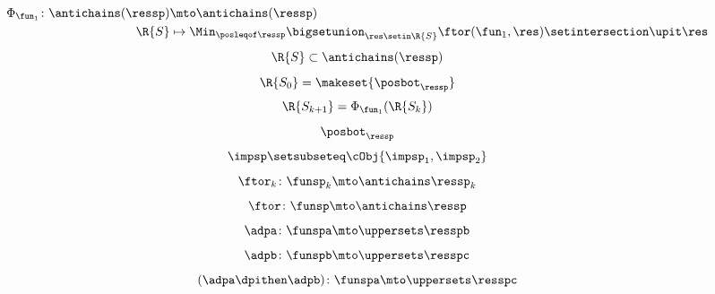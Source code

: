 {\begin{forslides}
\begin{equation}
\begin{aligned}
                \Phi_{\fun_1}\colon \antichains(\ressp) & \mto \antichains(\ressp) \\
                \R{S}                                   & \mapsto \Min_{\posleqof\ressp} \bigsetunion_{\res \setin \R{S}}\ftor(\fun_1,\res)\setintersection \upit \res
            \end{aligned}
        \end{equation}
        \begin{equation}
            \label{eq:genfun_11}
            \R{S}\subset \antichains(\ressp)
        \end{equation}
        \begin{equation}
            \label{eq:genfun_12}
            \R{S_0}=\makeset{ \posbot_\ressp}
        \end{equation}
        \begin{equation}
            \label{eq:genfun_13}
            \R{S_{k+1}}=\Phi_{\fun_1}(\R{S_k})
        \end{equation}
        \begin{equation}
            \label{eq:genfun_14}
            \posbot_{\ressp}
        \end{equation}
        \begin{equation}
            \label{eq:imp_comp}
            \impsp \setsubseteq \cObj{ \impsp_{1}, \impsp_{2}}
        \end{equation}
        \begin{equation}
            \label{eq:dp_mob_4}
            \ftor_k\colon \funsp_k \mto \antichains \ressp_k
        \end{equation}
        \begin{equation}
            \label{eq:dp_mob_5}
            \ftor\colon \funsp \mto \antichains \ressp
        \end{equation}
        \begin{equation}
            \label{eq:dp_mob_6}
            \adpa\colon \funspa \mto \uppersets \resspb
        \end{equation}
        \begin{equation}
            \label{eq:dp_mob_7}
            \adpb\colon \funspb \mto \uppersets \resspc
        \end{equation}
        \begin{equation}
            \label{eq:dp_mob_8}
            (\adpa\dpithen \adpb) \colon \funspa \mto \uppersets \resspc
        \end{equation}
    \end{forslides}
}

